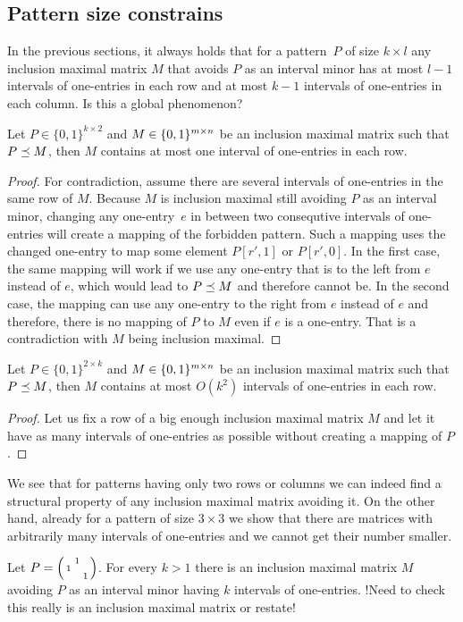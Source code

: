 \subsection{Pattern size constrains}
In the previous sections, it always holds that for a pattern~$P$ of size $k\times l$ any inclusion maximal matrix $M$ that avoids $P$ as an interval minor has at most $l-1$ intervals of one-entries in each row and at most $k-1$ intervals of one-entries in each column. Is this a global phenomenon?

\begin{thm}
Let $P\in\{0,1\}^{k\times2}$ and $M\in\{0,1\}^{m\times n}$ be an inclusion maximal matrix such that $P\preceq M$, then $M$ contains at most one interval of one-entries in each row.
\end{thm}
\begin{proof}
For contradiction, assume there are several intervals of one-entries in the same row of $M$. Because $M$ is inclusion maximal still avoiding $P$ as an interval minor, changing any one-entry~$e$ in between two consequtive intervals of one-entries will create a mapping of the forbidden pattern. Such a mapping uses the changed one-entry to map some element $P[r',1]$ or $P[r',0]$. In the first case, the same mapping will work if we use any one-entry that is to the left from $e$ instead of $e$, which would lead to $P\preceq M$ and therefore cannot be. In the second case, the mapping can use any one-entry to the right from $e$ instead of $e$ and therefore, there is no mapping of $P$ to $M$ even if $e$ is a one-entry. That is a contradiction with $M$ being inclusion maximal.
\end{proof}
\begin{thm}
Let $P\in\{0,1\}^{2\times k}$ and $M\in\{0,1\}^{m\times n}$ be an inclusion maximal matrix such that $P\preceq M$, then $M$ contains at most $O(k^2)$ intervals of one-entries in each row.
\end{thm}
\begin{proof}
Let us fix a row of a big enough inclusion maximal matrix $M$ and let it have as many intervals of one-entries as possible without creating a mapping of $P$.
\end{proof}
We see that for patterns having only two rows or columns we can indeed find a structural property of any inclusion maximal matrix avoiding it. On the other hand, already for a pattern of size $3\times3$ we show that there are matrices with arbitrarily many intervals of one-entries and we cannot get their number smaller.
\begin{thm}
\label{manyints}
Let $P=\left(\begin{smallmatrix} &1& \\1& & \\ & &1\end{smallmatrix}\right)$. For every $k>1$ there is an inclusion maximal matrix $M$ avoiding $P$ as an interval minor having $k$ intervals of one-entries.
!Need to check this really is an inclusion maximal matrix or restate!
\end{thm}
